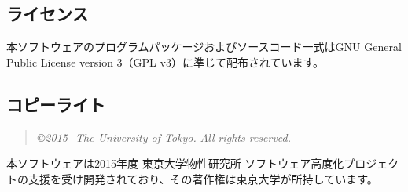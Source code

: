 \subsection{ライセンス}
本ソフトウェアのプログラムパッケージおよびソースコード一式はGNU General Public License version 3（GPL v3）に準じて配布されています。

\subsection{コピーライト}
\begin{quote}
{\it \copyright  2015- The University of Tokyo.} {\it All rights reserved.}
\end{quote}
本ソフトウェアは2015年度 東京大学物性研究所 ソフトウェア高度化プロジェクトの支援を受け開発されており、その著作権は東京大学が所持しています。

